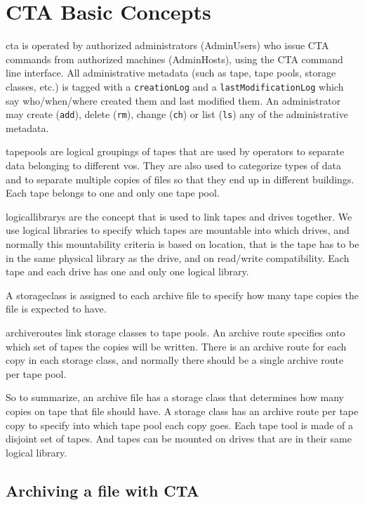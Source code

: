 \chapter{CTA Basic Concepts}

\gls{cta} is operated by authorized administrators (AdminUsers) who issue CTA commands from authorized machines
(AdminHosts), using the CTA command line interface. All administrative metadata (such as tape, tape pools, storage
classes, etc.) is tagged with a {\tt creationLog} and a {\tt lastModificationLog} which say who\slash when\slash where
created them and last modified them. An administrator may create ({\tt add}), delete ({\tt rm}), change ({\tt ch}) or
list ({\tt ls}) any of the administrative metadata.

\glspl{tapepool} are logical groupings of tapes that are used by operators to separate data belonging to different
\glspl{vo}. They are also used to categorize types of data and to separate multiple copies of files so that they end up
in different buildings. Each tape belongs to one and only one tape pool.

\glspl{logicallibrary} are the concept that is used to link tapes and drives together. We use logical libraries to
specify which tapes are mountable into which drives, and normally this mountability criteria is based on location,
that is the tape has to be in the same physical library as the drive, and on read\slash write compatibility. Each tape
and each drive has one and only one logical library.

A \gls{storageclass} is assigned to each archive file to specify how many tape copies the file is expected to have.

\glspl{archiveroute} link storage classes to tape pools. An archive route specifies onto which set of tapes the
copies will be written. There is an archive route for each copy in each storage class, and normally there should
be a single archive route per tape pool.

So to summarize, an archive file has a storage class that determines how many copies on tape that file should
have. A storage class has an archive route per tape copy to specify into which tape pool each copy goes. Each tape
tool is made of a disjoint set of tapes. And tapes can be mounted on drives that are in their same logical library.

\section{Archiving a file with CTA}

